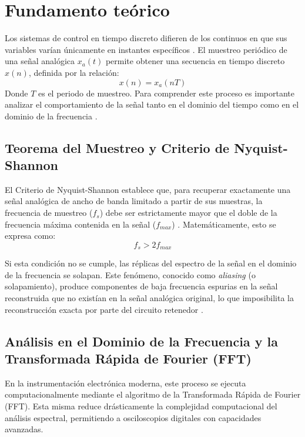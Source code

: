 \documentclass[conference]{IEEEtran}
\begin{document}

\section{Fundamento teórico}


Los sistemas de control en tiempo discreto difieren de los continuos en que sus variables varían únicamente en instantes específicos \cite{ogata}. 
El muestreo periódico de una señal analógica $x_a(t)$ permite obtener una secuencia en tiempo discreto $x(n)$, definida por la relación:
\begin{equation}
    x(n) = x_a(nT)
\end{equation}
Donde $T$ es el periodo de muestreo. Para comprender este proceso es importante analizar el comportamiento de la señal tanto en el dominio del tiempo como en el dominio de la frecuencia \cite{fadali}.

\subsection{Teorema del Muestreo y Criterio de Nyquist-Shannon}

El Criterio de Nyquist-Shannon establece que, para recuperar exactamente una señal analógica de ancho de banda limitado a partir de sus muestras,
la frecuencia de muestreo ($f_s$) debe ser estrictamente mayor que el doble de la frecuencia máxima contenida en la señal ($f_{max}$) \cite{garcia}. Matemáticamente, esto se expresa como:
\begin{equation}
    f_s > 2f_{max}
\end{equation}

Si esta condición no se cumple, las réplicas del espectro de la señal en el dominio de la frecuencia se solapan. Este fenómeno,
conocido como \textit{aliasing} (o solapamiento), produce componentes de baja frecuencia espurias en la señal reconstruida que no existían en la señal analógica original,
lo que imposibilita la reconstrucción exacta por parte del circuito retenedor \cite{alvarado}.

\subsection{Análisis en el Dominio de la Frecuencia y la Transformada Rápida de Fourier (FFT)}

En la instrumentación electrónica moderna, este proceso se ejecuta computacionalmente mediante el algoritmo de la Transformada Rápida de Fourier (FFT). 
Esta misma reduce drásticamente la complejidad computacional del análisis espectral, permitiendo a osciloscopios digitales con capacidades avanzadas\cite{astrom}.
\end{document}

